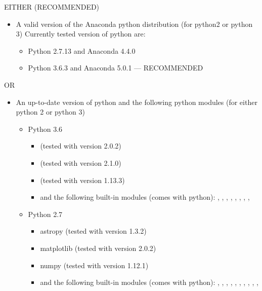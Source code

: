 \noindent EITHER (RECOMMENDED)
\begin{itemize}
\item A valid version of the Anaconda python distribution (for python2 or python 3)
	\noindent Currently tested version of python are:
	\begin{itemize}
	\item Python 2.7.13 and Anaconda 4.4.0
	\item Python 3.6.3 and Anaconda 5.0.1 --- RECOMMENDED
	\end{itemize}
\end{itemize}
\noindent OR
\begin{itemize}
\item An up-to-date version of python and the following python modules (for either python 2 or python 3)
	\begin{itemize}
	\item Python 3.6
		\begin{itemize}
		\item {} (tested with version 2.0.2)
		\item {} (tested with version 2.1.0)
		\item {} (tested with version 1.13.3)
		\item and the following built-in modules (comes with python): , , , , , , , , 
		\end{itemize}
	\item Python 2.7
		\begin{itemize}
		\item astropy (tested with version 1.3.2)
		\item matplotlib (tested with version 2.0.2)
		\item numpy (tested with version 1.12.1)
		\item and the following built-in modules (comes with python): , , , , , , , , , , 
		\end{itemize}
	\end{itemize}
\end{itemize}



\clearpage
\newpage
